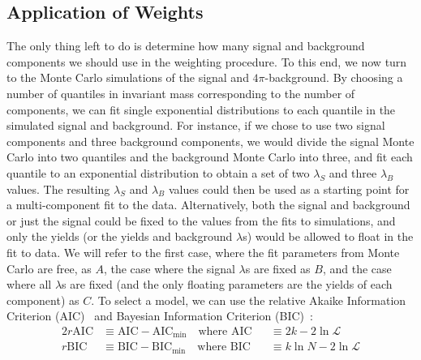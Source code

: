 \subsection{Application of Weights}\label{sec:application-of-weights}

The only thing left to do is determine how many signal and background components we should use in the weighting procedure. To this end, we now turn to the Monte Carlo simulations of the signal and $4\pi$-background. By choosing a number of quantiles in invariant mass corresponding to the number of components, we can fit single exponential distributions to each quantile in the simulated signal and background. For instance, if we chose to use two signal components and three background components, we would divide the signal Monte Carlo into two quantiles and the background Monte Carlo into three, and fit each quantile to an exponential distribution to obtain a set of two $\lambda_S$ and three $\lambda_B$ values. The resulting $\lambda_S$ and $\lambda_B$ values could then be used as a starting point for a multi-component fit to the data. Alternatively, both the signal and background or just the signal could be fixed to the values from the fits to simulations, and only the yields (or the yields and background $\lambda$s) would be allowed to float in the fit to data. We will refer to the first case, where the fit parameters from Monte Carlo are free, as $A$, the case where the signal $\lambda$s are fixed as $B$, and the case where all $\lambda$s are fixed (and the only floating parameters are the yields of each component) as $C$. To select a model, we can use the relative Akaike Information Criterion (AIC)~\cite{akaike_information_1998} and Bayesian Information Criterion (BIC)~\cite{schwarz_estimating_1978}:
\begin{alignat}{2}
  r\text{AIC} &\equiv \text{AIC} - \text{AIC}_\text{min} \quad\text{where } \text{AIC} &&\equiv 2k - 2\ln\mathcal{L} \\
  r\text{BIC} &\equiv \text{BIC} - \text{BIC}_\text{min} \quad\text{where } \text{BIC} &&\equiv k\ln{N} - 2\ln\mathcal{L} \\
  \label{eq:information-criteria}
\end{alignat}
